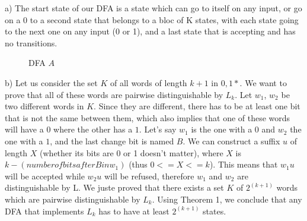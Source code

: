 
a) The start state of our DFA is a state which can go to itself on any input, or go on a 0 to a second state that belongs to a bloc of K states, with each state going to the next one on any input (0 or 1), and a last state that is accepting and has no transitions.

\begin{figure}[H]
\centering
{}
\caption{DFA $A$}
\end{figure}

b) Let us consider the set $K$ of all words of length $k+1$ in ${0,1}*$. We want to prove that all of these words are pairwise distinguishable by $L_k$. Let $w_1$, $w_2$ be two different words in $K$. Since they are different, there has to be at least one bit that is not the same between them, which also implies that one of these words will have a $0$ where the other has a $1$. Let's say $w_1$ is the one with a $0$ and $w_2$ the one with a $1$, and the last change bit is named $B$. We can construct a suffix $u$ of length $X$ (whether its bits are 0 or 1 doesn't matter), where $X$ is $k - (number of bits after B in w_1)$ (thus $0 <= X <= k$).
This means that $w_1u$ will be accepted while $w_2u$ will be refused, therefore $w_1$ and $w_2$ are distinguishable by L.
We juste proved that there exists a set $K$ of $2^{(k+1)}$ words which are pairwise distinguishable by $L_k$. Using Theorem 1, we conclude that any DFA that implements $L_k$ has to have at least $2^{(k+1)}$ states.
